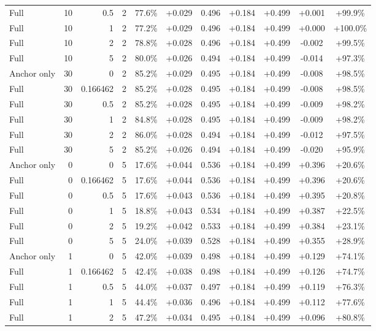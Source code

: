 \begin{table}[htbp]
\begin{tabular}{lrrrccccccc}
Full & 10 & 0.5 & 2 & 77.6\% & +0.029 & 0.496 & +0.184 & +0.499 & +0.001 & +99.9\% \\
Full & 10 & 1 & 2 & 77.2\% & +0.029 & 0.496 & +0.184 & +0.499 & +0.000 & +100.0\% \\
Full & 10 & 2 & 2 & 78.8\% & +0.028 & 0.496 & +0.184 & +0.499 & -0.002 & +99.5\% \\
Full & 10 & 5 & 2 & 80.0\% & +0.026 & 0.494 & +0.184 & +0.499 & -0.014 & +97.3\% \\
Anchor only & 30 & 0 & 2 & 85.2\% & +0.029 & 0.495 & +0.184 & +0.499 & -0.008 & +98.5\% \\
Full & 30 & 0.166462 & 2 & 85.2\% & +0.028 & 0.495 & +0.184 & +0.499 & -0.008 & +98.5\% \\
Full & 30 & 0.5 & 2 & 85.2\% & +0.028 & 0.495 & +0.184 & +0.499 & -0.009 & +98.2\% \\
Full & 30 & 1 & 2 & 84.8\% & +0.028 & 0.495 & +0.184 & +0.499 & -0.009 & +98.2\% \\
Full & 30 & 2 & 2 & 86.0\% & +0.028 & 0.494 & +0.184 & +0.499 & -0.012 & +97.5\% \\
Full & 30 & 5 & 2 & 85.2\% & +0.026 & 0.494 & +0.184 & +0.499 & -0.020 & +95.9\% \\
Anchor only & 0 & 0 & 5 & 17.6\% & +0.044 & 0.536 & +0.184 & +0.499 & +0.396 & +20.6\% \\
Full & 0 & 0.166462 & 5 & 17.6\% & +0.044 & 0.536 & +0.184 & +0.499 & +0.396 & +20.6\% \\
Full & 0 & 0.5 & 5 & 17.6\% & +0.043 & 0.536 & +0.184 & +0.499 & +0.395 & +20.8\% \\
Full & 0 & 1 & 5 & 18.8\% & +0.043 & 0.534 & +0.184 & +0.499 & +0.387 & +22.5\% \\
Full & 0 & 2 & 5 & 19.2\% & +0.042 & 0.533 & +0.184 & +0.499 & +0.384 & +23.1\% \\
Full & 0 & 5 & 5 & 24.0\% & +0.039 & 0.528 & +0.184 & +0.499 & +0.355 & +28.9\% \\
Anchor only & 1 & 0 & 5 & 42.0\% & +0.039 & 0.498 & +0.184 & +0.499 & +0.129 & +74.1\% \\
Full & 1 & 0.166462 & 5 & 42.4\% & +0.038 & 0.498 & +0.184 & +0.499 & +0.126 & +74.7\% \\
Full & 1 & 0.5 & 5 & 44.0\% & +0.037 & 0.497 & +0.184 & +0.499 & +0.119 & +76.3\% \\
Full & 1 & 1 & 5 & 44.4\% & +0.036 & 0.496 & +0.184 & +0.499 & +0.112 & +77.6\% \\
Full & 1 & 2 & 5 & 47.2\% & +0.034 & 0.495 & +0.184 & +0.499 & +0.096 & +80.8\% \\

\end{tabular}
\end{table}

